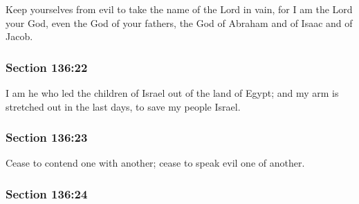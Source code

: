 		Keep yourselves from evil to take the name of the Lord in vain, for I am the Lord your God, even the God of your fathers, the God of Abraham and of Isaac and of Jacob.


	\subsubsection{Section 136:22} %
		\label{DC136-22}

		I am he who led the children of Israel out of the land of Egypt; and my arm is stretched out in the last days, to save my people Israel.


	\subsubsection{Section 136:23} %
		\label{DC136-23}

		Cease to contend one with another; cease to speak evil one of another.


	\subsubsection{Section 136:24} %
		\label{DC136-24}

